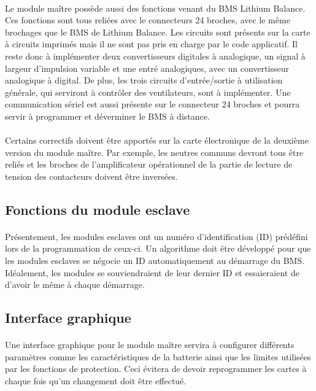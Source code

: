 		\paragraph{}
		Le module maître possède aussi des fonctions venant du BMS Lithium Balance. Ces fonctions sont tous reliées avec le connecteurs 24 broches, avec le même brochages que le BMS de Lithium Balance. Les circuits sont présents sur la carte à circuits imprimés mais il ne sont pas pris en charge par le code applicatif. Il reste donc à implémenter deux convertisseurs digitales à analogique, un signal à largeur d'impulsion variable et une entré analogiques, avec un convertisseur analogique à digital. De plus, les trois circuits d'entrée/sortie à utilisation générale, qui serviront à contrôler des ventilateurs, sont à implémenter. Une communication sériel est aussi présente sur le connecteur 24 broches et pourra servir à programmer et déverminer le BMS à distance.

		\paragraph{}
		Certains correctifs doivent être apportés sur la carte électronique de la deuxième version du module maître. Par exemple, les neutres communs devront tous être reliés et les broches de l'amplificateur opérationnel de la partie de lecture de tension des contacteurs doivent être inversées.

	\subsection{Fonctions du module esclave}

		\paragraph{}
		Présentement, les modules esclaves ont un numéro d'identification (ID) prédéfini lors de la programmation de ceux-ci. Un algorithme doit être développé pour que les modules esclaves se négocie un ID automatiquement au démarrage du BMS. Idéalement, les modules se souviendraient de leur dernier ID et essaieraient de d'avoir le même à chaque démarrage.

	\subsection{Interface graphique}
		\paragraph{}
		Une interface graphique pour le module maître servira à configurer différents paramètres comme les caractéristiques de la batterie ainsi que les limites utilisées par les fonctions de protection. Ceci évitera de devoir reprogrammer les cartes à chaque fois qu'un changement doit être effectué.

